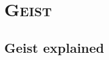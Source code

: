 \documentclass[xcolor=x11names,compress]{beamer}
\renewcommand{\(}{\begin{columns}}
\renewcommand{\)}{\end{columns}}
\newcommand{\<}[1]{\begin{column}{#1}}
\renewcommand{\>}{\end{column}}
\begin{document}
\subsection{}

\begin{frame}
\frametitle{}


\end{frame}



\subsection{}
\begin{frame}
\frametitle{}


\end{frame}

\subsection{}
\begin{frame}
\frametitle{}


\end{frame}


\begin{frame}
\frametitle{}


\end{frame}


\begin{frame}
\frametitle{}
\vspace{3mm}

\end{frame}


\begin{frame}
\frametitle{}


\end{frame}

\begin{frame}
\frametitle{}

\end{frame}




\section{ \scshape Geist}

\subsection{Geist explained}
\begin{frame}
\frametitle{}

\end{frame}
\end{document}
